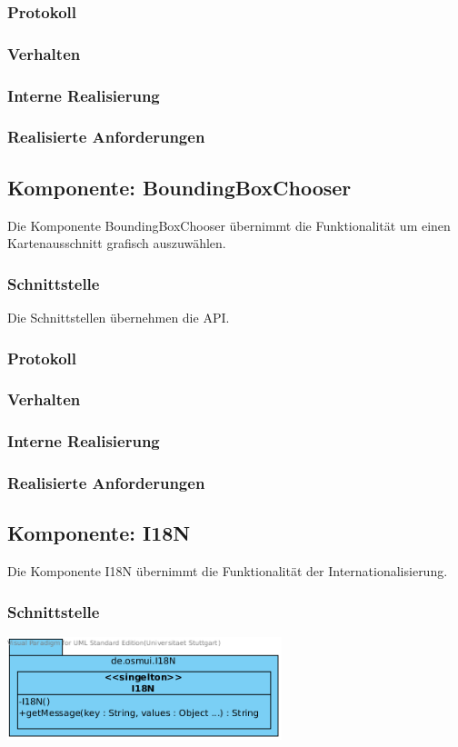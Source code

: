 \documentclass[a4paper,12pt]{scrartcl}
\begin{document}
\subsubsection{Protokoll}
\subsubsection{Verhalten}
\subsubsection{Interne Realisierung}
\subsubsection{Realisierte Anforderungen}

\subsection{Komponente: BoundingBoxChooser}
Die Komponente BoundingBoxChooser übernimmt die Funktionalität um einen Kartenausschnitt grafisch auszuwählen.
\subsubsection{Schnittstelle}
Die Schnittstellen übernehmen die API.
\subsubsection{Protokoll}
\subsubsection{Verhalten}
\subsubsection{Interne Realisierung}
\subsubsection{Realisierte Anforderungen}

\subsection{Komponente: I18N}
Die Komponente I18N übernimmt die Funktionalität der Internationalisierung.
\subsubsection{Schnittstelle}
\begin{center}
\includegraphics[width=8cm]{Schnittstelle_I18N.png}
\end{center}
\end{document}
